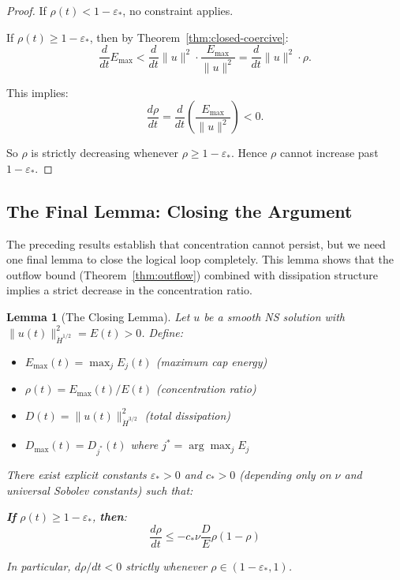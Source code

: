 \documentclass[11pt]{article}
\newtheorem{lemma}[theorem]{Lemma}
\theoremstyle{definition}
\begin{document}
\begin{proof}
If $\rho(t) < 1 - \varepsilon_*$, no constraint applies.

If $\rho(t) \geq 1 - \varepsilon_*$, then by Theorem~\ref{thm:closed-coercive}:
\begin{equation}
\frac{d}{dt}E_{\max} < \frac{d}{dt}\|u\|^2 \cdot \frac{E_{\max}}{\|u\|^2} = \frac{d}{dt}\|u\|^2 \cdot \rho.
\end{equation}

This implies:
\begin{equation}
\frac{d\rho}{dt} = \frac{d}{dt}\left(\frac{E_{\max}}{\|u\|^2}\right) < 0.
\end{equation}

So $\rho$ is strictly decreasing whenever $\rho \geq 1 - \varepsilon_*$. Hence $\rho$ cannot increase past $1 - \varepsilon_*$.
\end{proof}

\subsection{The Final Lemma: Closing the Argument}

The preceding results establish that concentration cannot persist, but we need one final lemma to close the logical loop completely. This lemma shows that the outflow bound (Theorem~\ref{thm:outflow}) combined with dissipation structure implies a strict decrease in the concentration ratio.

\begin{lemma}[The Closing Lemma]\label{lem:closing}
Let $u$ be a smooth NS solution with $\|u(t)\|_{\dot{H}^{1/2}}^2 = E(t) > 0$. Define:
\begin{itemize}
\item $E_{\max}(t) = \max_j E_j(t)$ (maximum cap energy)
\item $\rho(t) = E_{\max}(t)/E(t)$ (concentration ratio)
\item $D(t) = \|u(t)\|_{\dot{H}^{3/2}}^2$ (total dissipation)
\item $D_{\max}(t) = D_{j^*}(t)$ where $j^* = \arg\max_j E_j$
\end{itemize}

There exist explicit constants $\varepsilon_* > 0$ and $c_* > 0$ (depending only on $\nu$ and universal Sobolev constants) such that:

\textbf{If} $\rho(t) \geq 1 - \varepsilon_*$, \textbf{then}:
\begin{equation}\label{eq:closing}
\boxed{\frac{d\rho}{dt} \leq -c_* \nu \frac{D}{E} \rho (1-\rho)}
\end{equation}

In particular, $d\rho/dt < 0$ strictly whenever $\rho \in (1-\varepsilon_*, 1)$.
\end{lemma}
\end{document}
